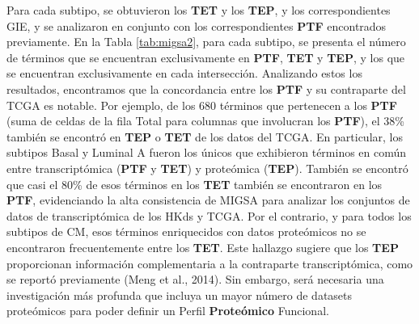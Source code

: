 \documentclass[12pt,twoside]{reedthesis}
\begin{document}
Para cada subtipo, se obtuvieron los \textbf{TET} y los \textbf{TEP}, y los correspondientes GIE, y se analizaron en conjunto con los correspondientes \textbf{PTF} encontrados previamente. En la Tabla \ref{tab:migsa2}, para cada subtipo, se presenta el número de términos que se encuentran exclusivamente en \textbf{PTF}, \textbf{TET} y \textbf{TEP}, y los que se encuentran exclusivamente en cada intersección. Analizando estos los resultados, encontramos que la concordancia entre los \textbf{PTF} y su contraparte del TCGA es notable. Por ejemplo, de los 680 términos que pertenecen a los \textbf{PTF} (suma de celdas de la fila Total para columnas que involucran los \textbf{PTF}), el 38\% también se encontró en \textbf{TEP} o \textbf{TET} de los datos del TCGA. En particular, los subtipos Basal y Luminal A fueron los únicos que exhibieron términos en común entre transcriptómica (\textbf{PTF} y \textbf{TET}) y proteómica (\textbf{TEP}). También se encontró que casi el 80\% de esos términos en los \textbf{TET} también se encontraron en los \textbf{PTF}, evidenciando la alta consistencia de MIGSA para analizar los conjuntos de datos de transcriptómica de los HKds y TCGA. Por el contrario, y para todos los subtipos de CM, esos términos enriquecidos con datos proteómicos no se encontraron frecuentemente entre los \textbf{TET}. Este hallazgo sugiere que los \textbf{TEP} proporcionan información complementaria a la contraparte transcriptómica, como se reportó previamente (Meng et al., 2014). Sin embargo, será necesaria una investigación más profunda que incluya un mayor número de datasets proteómicos para poder definir un Perfil \textbf{Proteómico} Funcional.
\end{document}
